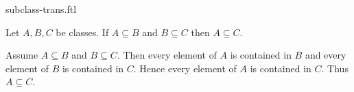 \documentclass{article}
\begin{document}
\begin{smodule}{subclass-trans.ftl}

  \begin{fproposition*}[label=3939677545431040]
    Let $A, B, C$ be classes.
    If $A \subseteq B$ and $B \subseteq C$ then $A \subseteq C$.
  \end{fproposition*}
  \begin{fproof*}
    Assume $A \subseteq B$ and $B \subseteq C$.
    Then every element of $A$ is contained in $B$ and every element of $B$ is contained in $C$.
    Hence every element of $A$ is contained in $C$.
    Thus $A \subseteq C$.
  \end{fproof*}
\end{smodule}
\end{document}
